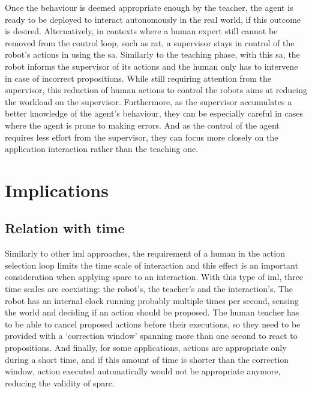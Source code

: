 Once the behaviour is deemed appropriate enough by the teacher, the agent is ready to be deployed to interact autonomously in the real world, if this outcome is desired. Alternatively, in contexts where a human expert still cannot be removed from the control loop, such as \gls{rat}, a supervisor stays in control of the robot's actions in using the \gls{sa}. Similarly to the teaching phase, with this \gls{sa}, the robot informs the supervisor of its actions and the human only has to intervene in case of incorrect propositions. While still requiring attention from the supervisor, this reduction of human actions to control the robots aims at reducing the workload on the supervisor. Furthermore, as the supervisor accumulates a better knowledge of the agent's behaviour, they can be especially careful in cases where the agent is prone to making errors. And as the control of the agent requires less effort from the supervisor, they can focus more closely on the application interaction rather than the teaching one. 

\section{Implications}

\subsection{Relation with time}
Similarly to other \gls{iml} approaches, the requirement of a human in the action selection loop limits the time scale of interaction and this effect is an important consideration when applying \gls{sparc} to an interaction. With this type of \gls{iml}, three time scales are coexisting: the robot's, the teacher's and the interaction's. The robot has an internal clock running probably multiple times per second, sensing the world and deciding if an action should be proposed. The human teacher has to be able to cancel proposed actions before their executions, so they need to be provided with a `correction window' spanning more than one second to react to propositions. And finally, for some applications, actions are appropriate only during a short time, and if this amount of time is shorter than the correction window, action executed automatically would not be appropriate anymore, reducing the validity of \gls{sparc}.

